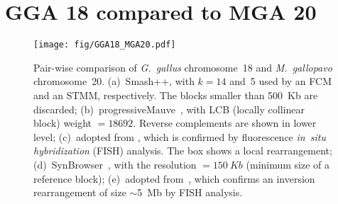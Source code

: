 \documentclass[a4paper,9pt]{extarticle}
\begin{document}
  


\clearpage
\section{GGA 18 compared to MGA 20}
\begin{figure}[!h]
  \centering
  \texttt{[image: fig/GGA18\_MGA20.pdf]}
  \caption{Pair-wise comparison of \textit{G.~gallus} chromosome~18 and \textit{M.~gallopavo} chromosome~20.
  (a)~Smash++, with $k=14$ and~5 used by an FCM and an STMM, respectively. The blocks smaller than 500~Kb are discarded;
  (b)~progressiveMauve~\cite{darling2010progressivemauve}, with LCB (locally collinear block) weight $=18692$. Reverse complements are shown in lower level;
  (c)~adopted from \cite{zhang2011comparative}, which is confirmed by fluorescence \textit{in~situ hybridization} (FISH) analysis. The box shows a local rearrangement;
  (d)~SynBrowser~\cite{lee2016synteny}, with the resolution $=150~Kb$ (minimum size of a reference block);
  (e)~adopted from~\cite{dalloul2010multi}, which confirms an inversion rearrangement of size $\sim$5~Mb by FISH analysis.}
  \label{fig.supp.GGA18.MGA20}
\end{figure}
\end{document}
